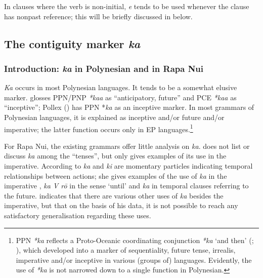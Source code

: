 In clauses where the verb is non-initial, \textit{e} tends to be used whenever the clause has nonpast reference; this will be briefly discussed in  below.
\subsection{The contiguity marker \textit{ka}}\label{sec:7.2.6}
\subsubsection[Introduction: ka in Polynesian and in Rapa Nui]{Introduction: \textit{ka} in Polynesian and in Rapa Nui}\label{sec:7.2.6.1}

\textit{Ka} occurs in most Polynesian languages. It tends to be a somewhat elusive marker. \citet[347–348]{Pawley1970} glosses PPN/PNP \textit{*kaa} as “anticipatory, future” and PCE \textit{*kaa} as “inceptive”; Pollex (\citealt{GreenhillClark2011}) has PPN *\textit{ka} as an inceptive marker. In most grammars of Polynesian languages, it is explained as inceptive and/or future and/or imperative; the latter function occurs only in EP languages.\footnote{\label{fn:330}PPN \textit{*ka} reflects a Proto-Oceanic coordinating conjunction \textit{*ka} ‘and then’ (\citealt[85]{LynchRoss2002}; \citealt{Lichtenberk2014}), which developed into a marker of sequentiality, future tense, irrealis, imperative and/or inceptive in various (groups of) languages. Evidently, the use of \textit{*ka} is not narrowed down to a single function in Polynesian.} 

For Rapa Nui, the existing grammars offer little analysis on \textit{ka}. \citet[63, 72]{Englert1978} does not list or discuss \textit{ka} among the “tenses”, but only gives examples of its use in the imperative. According to \citet[37]{DuFeu1996} \textit{ka} and \textit{ki} are momentary particles indicating temporal relationships between actions; she gives examples of the use of \textit{ka} in the imperative , \textit{ka V rō} in the sense ‘until’  and \textit{ka} in temporal clauses referring to the future. \citet[154]{Chapin1978} indicates that there are various other uses of \textit{ka} besides the imperative, but that on the basis of his data, it is not possible to reach any satisfactory generalisation regarding these uses.

